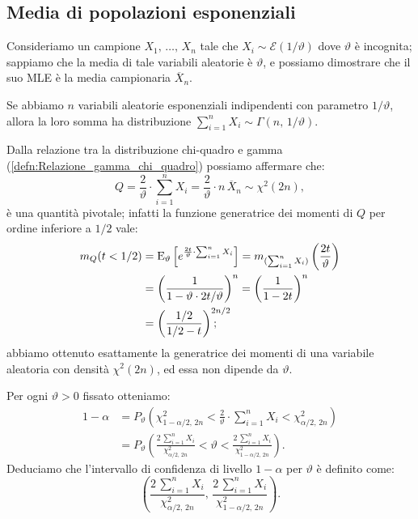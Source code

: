         \subsection{Media di popolazioni esponenziali}
            \begin{defn}
                Consideriamo un campione $X_1,\, \ldots,\, X_{n}$ tale che $X_i \sim \mathcal{E}(1 /\vartheta)$ 
                dove $\vartheta$ è incognita; sappiamo che la media di tale variabili aleatorie è $\vartheta$, 
                e possiamo dimostrare che il suo MLE è la media campionaria $\overline{X}_n$.

                Se abbiamo $n$ variabili aleatorie esponenziali indipendenti con parametro $1 /\vartheta$, 
                allora la loro somma ha distribuzione $\sum_{i=1}^{n} X_i \sim \Gamma(n,\,1 /\vartheta)$.

                Dalla relazione tra la distribuzione chi-quadro e gamma (\ref{defn:Relazione_gamma_chi_quadro}) 
                possiamo affermare che: \[
                    Q = \frac{2}{\vartheta}\cdot \sum_{i=1}^{n} X_i = \frac{2}{\vartheta}\cdot n\,\overline{X}_n 
                    \sim \chi^2(2n)
                ,\] è una quantità pivotale; infatti la funzione generatrice dei momenti di $Q$ per ordine 
                inferiore a $1 /2$ vale:
                \begin{align*}
                    m_{Q}(t < 1 /2) &= \text{E}_{\vartheta}\left[e^{\frac{2t}{\vartheta}\cdot 
                    \sum_{i=1}^{n} X_i}\right] = m_{(\sum_{i=1}^{n} X_i)}\left(\frac{2t}{\vartheta}\right) \\
                    &= \left(\frac{1}{1-\vartheta\cdot 2t /\vartheta}\right)^n
                    = \left(\frac{1}{1-2t}\right)^n \\
                    &= \left(\frac{1 /2}{1 /2 -t}\right)^{2n /2}
                \hspace{-1.7em};\end{align*}
                abbiamo ottenuto esattamente la generatrice dei momenti di una variabile aleatoria con densità 
                $\chi^2(2n)$, ed essa non dipende da $\vartheta$.
                
                Per ogni $\vartheta > 0$ fissato otteniamo:
                \begin{align*}
                    1-\alpha &= P_\vartheta\left(\chi^2_{1-\alpha /2,\,2n} < \frac{2}{\vartheta}\cdot 
                    \sum_{i=1}^{n} X_i < \chi^2_{\alpha /2,\,2n}\right) \\
                    &= P_\vartheta\left(\frac{2\,\sum_{i=1}^{n} X_i}{\chi^2_{\alpha /2,\,2n}} < \vartheta 
                    < \frac{2\,\sum_{i=1}^{n} X_i}{\chi^2_{1-\alpha /2,\,2n}}\right)
                .\end{align*}
                Deduciamo che l'intervallo di confidenza di livello $1-\alpha$ per $\vartheta$ è definito 
                come: \[
                    \left(\frac{2\,\sum_{i=1}^{n} X_i}{\chi^2_{\alpha /2,\,2n}},\, 
                    \frac{2\,\sum_{i=1}^{n} X_i}{\chi^2_{1-\alpha /2,\,2n}}\right)
                .\]
            \end{defn}
